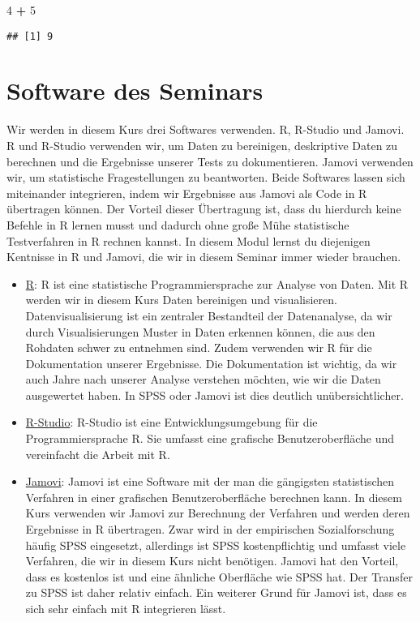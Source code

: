 \documentclass[
]{book}
\newenvironment{Shaded}{\begin{snugshade}}{\end{snugshade}}
\newcommand{\DecValTok}[1]{\textcolor[rgb]{0.00,0.00,0.81}{#1}}
\newcommand{\OperatorTok}[1]{\textcolor[rgb]{0.81,0.36,0.00}{\textbf{#1}}}
\newcommand{\StringTok}[1]{\textcolor[rgb]{0.31,0.60,0.02}{#1}}
\providecommand{\tightlist}{%
  \setlength{\itemsep}{0pt}\setlength{\parskip}{0pt}}
\begin{document}
\begin{Shaded}
\begin{Highlighting}[]
\DecValTok{4} \OperatorTok{+}\StringTok{ }\DecValTok{5}
\end{Highlighting}
\end{Shaded}

\begin{verbatim}
## [1] 9
\end{verbatim}

\hypertarget{software-des-seminars}{%
\section{Software des Seminars}\label{software-des-seminars}}

Wir werden in diesem Kurs drei Softwares verwenden. R, R-Studio und Jamovi. R und R-Studio verwenden wir, um Daten zu bereinigen, deskriptive Daten zu berechnen und die Ergebnisse unserer Tests zu dokumentieren. Jamovi verwenden wir, um statistische Fragestellungen zu beantworten. Beide Softwares lassen sich miteinander integrieren, indem wir Ergebnisse aus Jamovi als Code in R übertragen können. Der Vorteil dieser Übertragung ist, dass du hierdurch keine Befehle in R lernen musst und dadurch ohne große Mühe statistische Testverfahren in R rechnen kannst. In diesem Modul lernst du diejenigen Kentnisse in R und Jamovi, die wir in diesem Seminar immer wieder brauchen.

\begin{itemize}
\tightlist
\item
  \href{https://www.r-project.org/}{R}: R ist eine statistische Programmiersprache zur Analyse von Daten. Mit R werden wir in diesem Kurs Daten bereinigen und visualisieren. Datenvisualisierung ist ein zentraler Bestandteil der Datenanalyse, da wir durch Visualisierungen Muster in Daten erkennen können, die aus den Rohdaten schwer zu entnehmen sind. Zudem verwenden wir R für die Dokumentation unserer Ergebnisse. Die Dokumentation ist wichtig, da wir auch Jahre nach unserer Analyse verstehen möchten, wie wir die Daten ausgewertet haben. In SPSS oder Jamovi ist dies deutlich unübersichtlicher.
\item
  \href{https://rstudio.com/}{R-Studio}: R-Studio ist eine Entwicklungsumgebung für die Programmiersprache R. Sie umfasst eine grafische Benutzeroberfläche und vereinfacht die Arbeit mit R.
\item
  \href{https://www.jamovi.org/}{Jamovi}: Jamovi ist eine Software mit der man die gängigsten statistischen Verfahren in einer grafischen Benutzeroberfläche berechnen kann. In diesem Kurs verwenden wir Jamovi zur Berechnung der Verfahren und werden deren Ergebnisse in R übertragen. Zwar wird in der empirischen Sozialforschung häufig SPSS eingesetzt, allerdings ist SPSS kostenpflichtig und umfasst viele Verfahren, die wir in diesem Kurs nicht benötigen. Jamovi hat den Vorteil, dass es kostenlos ist und eine ähnliche Oberfläche wie SPSS hat. Der Transfer zu SPSS ist daher relativ einfach. Ein weiterer Grund für Jamovi ist, dass es sich sehr einfach mit R integrieren lässt.
\end{itemize}
\end{document}
